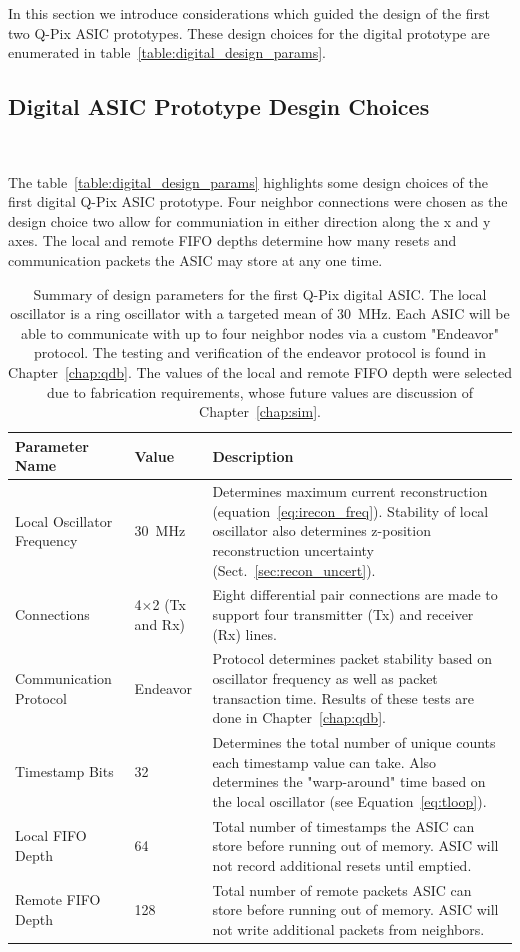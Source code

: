 In this section we introduce considerations which guided the design of the first two Q-Pix ASIC prototypes.
These design choices for the digital prototype are enumerated in table~\ref{table:digital_design_params}.

\subsection{Digital ASIC Prototype Desgin Choices}~\label{sec:design_choices}

The table~\ref{table:digital_design_params} highlights some design choices of the first digital Q-Pix ASIC prototype.
Four neighbor connections were chosen as the design choice two allow for communiation in either direction along the x and y axes.
The local and remote FIFO depths determine how many resets and communication packets the ASIC may store at any one time.

\begin{table}
\begin{center}
\begin{tabular}{||p{30mm} | p{30mm} | p{90mm}||}
 \hline
 Parameter Name & Value & Description \\ 
 \hline\hline
Local Oscillator Frequency & 30~\unit{MHz} & Determines maximum current reconstruction (equation~\ref{eq:irecon_freq}). Stability of local oscillator also determines z-position reconstruction uncertainty (Sect.~\ref{sec:recon_uncert}). \\
 \hline
Connections & 4$\times$2 (Tx and Rx) &  Eight differential pair connections are made to support four transmitter (Tx) and receiver (Rx) lines. \\
 \hline
Communication Protocol & Endeavor & Protocol determines packet stability based on oscillator frequency as well as packet transaction time. Results of these tests are done in Chapter~\ref{chap:qdb}. \\
 \hline
Timestamp Bits & 32 & Determines the total number of unique counts each timestamp value can take. Also determines the "warp-around" time based on the local oscillator (see Equation~\ref{eq:tloop}).  \\
 \hline
Local FIFO Depth & 64 & Total number of timestamps the ASIC can store before running out of memory. ASIC will not record additional resets until emptied. \\
 \hline
Remote FIFO Depth & 128 & Total number of remote packets ASIC can store before running out of memory. ASIC will not write additional packets from neighbors. \\
 \hline
 \hline
\end{tabular}
\caption{Summary of design parameters for the first Q-Pix digital ASIC.
The local oscillator is a ring oscillator with a targeted mean of 30~\unit{MHz}.
Each ASIC will be able to communicate with up to four neighbor nodes via a custom "Endeavor" protocol.
The testing and verification of the endeavor protocol is found in Chapter~\ref{chap:qdb}.
The values of the local and remote FIFO depth were selected due to fabrication requirements, whose future values are discussion of Chapter~\ref{chap:sim}.
}
\end{center}
\end{table}
~\label{table:digital_design_params}

